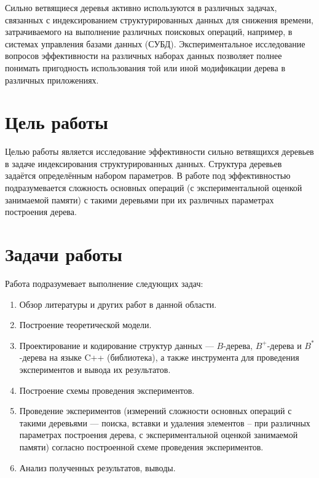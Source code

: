 \documentclass{llncs}
\begin{document}
	Сильно ветвящиеся деревья активно используются в различных задачах, связанных с индексированием структурированных данных для снижения времени, затрачиваемого на выполнение различных поисковых операций, например, в системах управления базами данных (СУБД). Экспериментальное исследование вопросов эффективности на различных наборах данных позволяет полнее понимать пригодность использования той или иной модификации дерева в различных приложениях.
	
	\vspace{-1em}
	
	\section{Цель работы}
	
	Целью работы является исследование эффективности сильно ветвящихся деревьев в задаче индексирования структурированных данных. Структура деревьев задаётся определённым набором параметров. В работе под эффективностью подразумевается сложность основных операций (с экспериментальной оценкой занимаемой памяти) с такими деревьями при их различных параметрах построения дерева.
	
	\vspace{-1em}
	
	\section{Задачи работы}
	
	Работа подразумевает выполнение следующих задач:
	
	\begin{enumerate}
		\item Обзор литературы и других работ в данной области.
		\item Построение теоретической модели.
		\item Проектирование и кодирование структур данных --- $B$-дерева, $B^+$-дерева и $B^*$-дерева на языке C++ (библиотека), а также инструмента для проведения экспериментов и вывода их результатов.
		\item Построение схемы проведения экспериментов.
		\item Проведение экспериментов (измерений сложности основных операций с такими деревьями --- поиска, вставки и удаления элементов – при различных параметрах построения дерева, с экспериментальной оценкой занимаемой памяти) согласно построенной схеме проведения экспериментов.
		\item Анализ полученных результатов, выводы.
	\end{enumerate}
    
\end{document}
